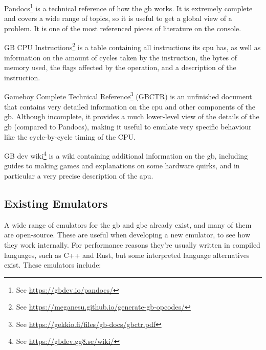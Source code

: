\documentclass[11pt]{informatics-report}
\newcommand{\ftnt}[1]{\footnote{See \url{#1}}}
\begin{document}
\begin{compactitem}
    \item Pandocs\ftnt{https://gbdev.io/pandocs/} is a technical reference of how the \gls{gb} works. It is extremely complete and covers a wide range of topics, so it is useful to get a global view of a problem. It is one of the most referenced pieces of literature on the console.
    \item GB CPU Instructions\ftnt{https://meganesu.github.io/generate-gb-opcodes/} is a table containing all instructions its \gls{cpu} has, as well as information on the amount of cycles taken by the instruction, the bytes of memory used, the flags affected by the operation, and a description of the instruction.
    \item Gameboy Complete Technical Reference\ftnt{https://gekkio.fi/files/gb-docs/gbctr.pdf} (GBCTR) is an unfinished document that contains very detailed information on the \gls{cpu} and other components of the \gls{gb}. Although incomplete, it provides a much lower-level view of the details of the \gls{gb} (compared to Pandocs), making it useful to emulate very specific behaviour like the cycle-by-cycle timing of the CPU.
    \item GB dev wiki\ftnt{https://gbdev.gg8.se/wiki/} is a wiki containing additional information on the \gls{gb}, including guides to making games and explanations on some hardware quirks, and in particular a very precise description of the \gls{apu}.
\end{compactitem}

\subsection{Existing Emulators}

A wide range of emulators for the \gls{gb} and \gls{gbc} already exist, and many of them are open-source. These are useful when developing a new emulator, to see how they work internally. For performance reasons they're usually written in compiled languages, such as C++ and Rust, but some interpreted language alternatives exist. These emulators include:
\end{document}
